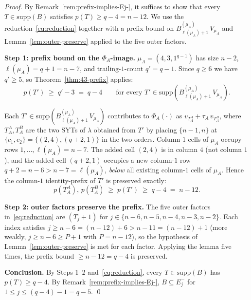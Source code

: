 \documentclass[11pt]{article}
\theoremstyle{definition}
\newcommand{\supp}{\mathrm{supp}}
\begin{document}
\begin{proof}
By Remark~\ref{rem:prefix-implies-Ej-}, it suffices to show that
every $T \in \supp(B)$ satisfies $p(T) \ge q - 4 = n - 12$.  We use
the reduction~\eqref{eq:reduction} together with a prefix bound on
$B^{(\mu_A)}_{\ell(\mu_A)+1}\,V_{\mu_A}$ and
Lemma~\ref{lem:outer-preserve} applied to the five outer factors.

\medskip\textbf{Step 1: prefix bound on the $\Phi_A$-image.}
$\mu_A = (4, 3, 1^{q-1})$ has size $n - 2$, $\ell(\mu_A) = q + 1
= n - 7$, and trailing-$1$-count $q' = q - 1$.  Since $q \ge 6$ we
have $q' \ge 5$, so Theorem~\ref{thm:43-prefix} applies:
\[
   p(T') \;\ge\; q' - 3 \;=\; q - 4
   \qquad \text{for every } T' \in \supp(B^{(\mu_A)}_{\ell(\mu_A)+1}\,V_{\mu_A}).
\]

Each $T' \in \supp(B^{(\mu_A)}_{\ell(\mu_A)+1}\,V_{\mu_A})$ contributes
to $\Phi_A(\cdot)$ as $v_{T_A^A} + \tau_A\,v_{T_A^B}$, where $T_A^A,
T_A^B$ are the two SYTs of $\lambda$ obtained from $T'$ by placing
$\{n-1, n\}$ at $\{c_1, c_2\} = \{(2, 4), (q+2, 1)\}$ in the two
orders.  Column-$1$ cells of $\mu_A$ occupy rows $1, \ldots,
\ell(\mu_A) = n - 7$.  The added cell $(2, 4)$ is in column $4$
(not column $1$), and the added cell $(q+2, 1)$ occupies a new
column-$1$ row $q + 2 = n - 6 > n - 7 = \ell(\mu_A)$, \emph{below}
all existing column-$1$ cells of $\mu_A$.  Hence the column-$1$
identity-prefix of $T'$ is preserved exactly:
\[
   p(T_A^A),\, p(T_A^B) \;\ge\; p(T') \;\ge\; q - 4 \;=\; n - 12.
\]

\medskip\textbf{Step 2: outer factors preserve the prefix.}
The five outer factors in~\eqref{eq:reduction} are $(T_j+1)$ for
$j \in \{n-6, n-5, n-4, n-3, n-2\}$.  Each index satisfies $j \ge
n - 6 = (n - 12) + 6 > n - 11 = (n - 12) + 1$ (more weakly,
$j \ge n - 6 \ge P + 1$ with $P = n - 12$), so the hypothesis of
Lemma~\ref{lem:outer-preserve} is met for each factor.  Applying the
lemma five times, the prefix bound $\ge n - 12 = q - 4$ is preserved.

\medskip\textbf{Conclusion.}  By Steps 1--2 and~\eqref{eq:reduction},
every $T \in \supp(B)$ has $p(T) \ge q - 4$.  By
Remark~\ref{rem:prefix-implies-Ej-}, $B \subseteq E_j^-$ for
$1 \le j \le (q - 4) - 1 = q - 5$.
\qed
\end{proof}
\end{document}
